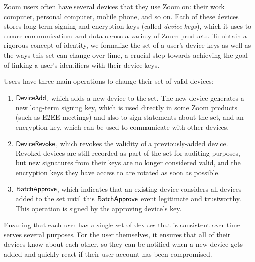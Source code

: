 Zoom users often have several devices that they use Zoom on: their work computer, personal computer,
mobile phone, and so on. Each of these devices stores long-term signing and encryption keys (called
\textit{device keys}), which it uses to secure communications and data across a variety of Zoom
products. To obtain a rigorous concept of identity, we formalize the set of a user's device keys as
well as the ways this set can change over time, a crucial step towards achieving the goal of linking
a user's identifiers with their device keys.

Users have three main operations to change their set of valid devices:
\begin{enumerate}
\item $\mathsf{DeviceAdd}{}$, which adds a new device to the set. The new device generates a new long-term
    signing key, which is used directly in some Zoom products (such as E2EE meetings) and also to
    sign statements about the set, and an encryption key, which can be used to communicate with
    other devices.
\item $\mathsf{DeviceRevoke}{}$, which revokes the validity of a previously-added device. Revoked devices
    are still recorded as part of the set for auditing purposes, but new signatures from their keys
    are no longer considered valid, and the encryption keys they have access to are rotated as soon
    as possible.
\item $\mathsf{BatchApprove}{}$, which indicates that an existing device considers all devices added to the
    set until this $\mathsf{BatchApprove}{}$ event legitimate and trustworthy. This operation is signed by
    the approving device's key.
\end{enumerate}

Ensuring that each user has a single set of devices that is consistent over time serves several
purposes. For the user themselves, it ensures that all of their devices know about each other, so
they can be notified when a new device gets added and quickly react if their user account has been
compromised.

